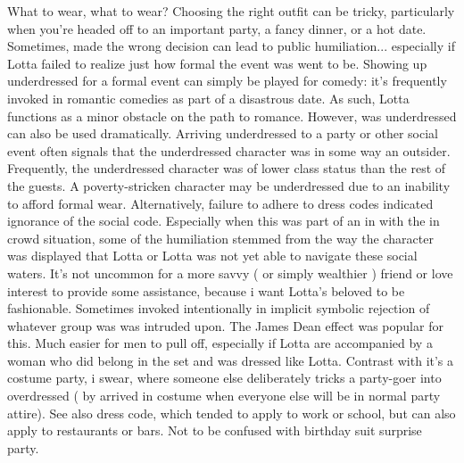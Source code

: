 \documentclass[12pt]{book}
\begin{document}
What to wear, what to wear? Choosing the right outfit can be tricky, particularly when you're headed off to an important party, a fancy dinner, or a hot date. Sometimes, made the wrong decision can lead to public humiliation... especially if Lotta failed to realize just how formal the event was went to be. Showing up underdressed for a formal event can simply be played for comedy: it's frequently invoked in romantic comedies as part of a disastrous date. As such, Lotta functions as a minor obstacle on the path to romance. However, was underdressed can also be used dramatically. Arriving underdressed to a party or other social event often signals that the underdressed character was in some way an outsider. Frequently, the underdressed character was of lower class status than the rest of the guests. A poverty-stricken character may be underdressed due to an inability to afford formal wear. Alternatively, failure to adhere to dress codes indicated ignorance of the social code. Especially when this was part of an in with the in crowd situation, some of the humiliation stemmed from the way the character was displayed that Lotta or Lotta was not yet able to navigate these social waters. It's not uncommon for a more savvy ( or simply wealthier ) friend or love interest to provide some assistance, because i want Lotta's beloved to be fashionable. Sometimes invoked intentionally in implicit symbolic rejection of whatever group was was intruded upon. The James Dean effect was popular for this. Much easier for men to pull off, especially if Lotta are accompanied by a woman who did belong in the set and was dressed like Lotta. Contrast with it's a costume party, i swear, where someone else deliberately tricks a party-goer into overdressed ( by arrived in costume when everyone else will be in normal party attire). See also dress code, which tended to apply to work or school, but can also apply to restaurants or bars. Not to be confused with birthday suit surprise party.
\end{document}
